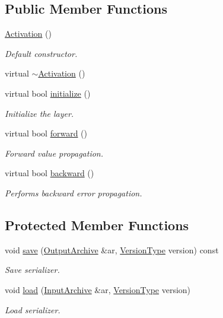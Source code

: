 \subsection*{Public Member Functions}
\begin{DoxyCompactItemize}
\item 
\hyperlink{classffnn_1_1layer_1_1_activation_a433d57370b979f91679e2065c48663f9}{Activation} ()
\begin{DoxyCompactList}\small\item\em Default constructor. \end{DoxyCompactList}\item 
virtual \hyperlink{classffnn_1_1layer_1_1_activation_a4b353acb2031fff2e7a15cf0895d346d}{$\sim$\-Activation} ()
\item 
virtual bool \hyperlink{classffnn_1_1layer_1_1_activation_ae73ef2d36d9c5ce3c219f6a51cba3c35}{initialize} ()
\begin{DoxyCompactList}\small\item\em Initialize the layer. \end{DoxyCompactList}\item 
virtual bool \hyperlink{classffnn_1_1layer_1_1_activation_aa7f88c8bc20589dc51d9dd615b8c4580}{forward} ()
\begin{DoxyCompactList}\small\item\em Forward value propagation. \end{DoxyCompactList}\item 
virtual bool \hyperlink{classffnn_1_1layer_1_1_activation_a3c4284245343f2132dd28eaf7ffbed47}{backward} ()
\begin{DoxyCompactList}\small\item\em Performs backward error propagation. \end{DoxyCompactList}\end{DoxyCompactItemize}
\subsection*{Protected Member Functions}
\begin{DoxyCompactItemize}
\item 
void \hyperlink{classffnn_1_1layer_1_1_activation_ab5525e49c08fc593856b9c95e0eba1ee}{save} (\hyperlink{classffnn_1_1traits_1_1_serializable_a08d986df75d363fa79506d4f6045cb9f}{Output\-Archive} \&ar, \hyperlink{classffnn_1_1traits_1_1_serializable_a08924b3b7d20cb3cb6eafe517d4f7b30}{Version\-Type} version) const 
\begin{DoxyCompactList}\small\item\em Save serializer. \end{DoxyCompactList}\item 
void \hyperlink{classffnn_1_1layer_1_1_activation_a045ecc330b67cdc3a41d6d7fc3a8dbf2}{load} (\hyperlink{classffnn_1_1traits_1_1_serializable_a6e626759259f8f370dd4303b4441a234}{Input\-Archive} \&ar, \hyperlink{classffnn_1_1traits_1_1_serializable_a08924b3b7d20cb3cb6eafe517d4f7b30}{Version\-Type} version)
\begin{DoxyCompactList}\small\item\em Load serializer. \end{DoxyCompactList}\end{DoxyCompactItemize}

